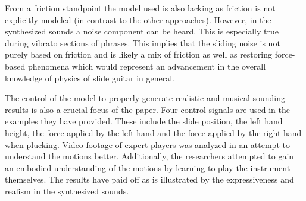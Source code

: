 \documentclass[main.tex]{subfiles}
\begin{document}
From a friction standpoint the model used is also lacking as friction is not explicitly modeled (in contrast to the other approaches). However, in the synthesized sounds a noise component can be heard. This is especially true during vibrato sections of phrases. This implies that the sliding noise is not purely based on friction and is likely a mix of friction as well as restoring force-based phenomena which would represent an advancement in the overall knowledge of physics of slide guitar in general.

The control of the model to properly generate realistic and musical sounding results is also a crucial focus of the paper. Four control signals are used in the examples they have provided. These include the slide position, the left hand height, the force applied by the left hand and the force applied by the right hand when plucking. Video footage of expert players was analyzed in an attempt to understand the motions better. Additionally, the researchers attempted to gain an embodied understanding of the motions by learning to play the instrument themselves. The results have paid off as is illustrated by the expressiveness and realism in the synthesized sounds.
\end{document}
